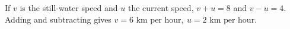 If $v$ is the still-water speed and $u$ the current speed, $v+u=8$ and $v-u=4$. Adding and subtracting gives $\boxed{v=6\text{ km per hour},\ u=2\text{ km per hour}}$.
